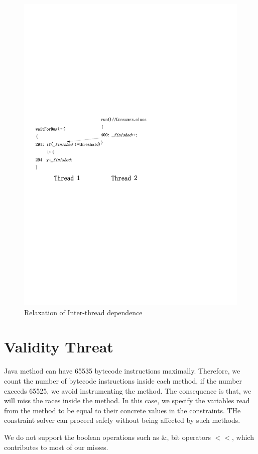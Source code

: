 \begin{figure}[htp]
\centering
\includegraphics[scale=0.7]{cases/Visio-bbuffer.pdf}
\caption{Relaxation of Inter-thread dependence}\label{fig:relax1}
\end{figure}



\section{Validity Threat}
Java method can have 65535 bytecode instructions maximally. Therefore, we count the number of bytecode instructions inside each method, if the number exceeds 65525, we avoid instrumenting the method. The consequence is that, we will miss the races inside the method. In this case, we specify the variables read from the method to be equal to their concrete values in the constraints. THe constraint solver can proceed safely without being affected by such methods.

We do not support the boolean operations such as $\&$, bit operators $<<$, which contributes to most of our misses.




